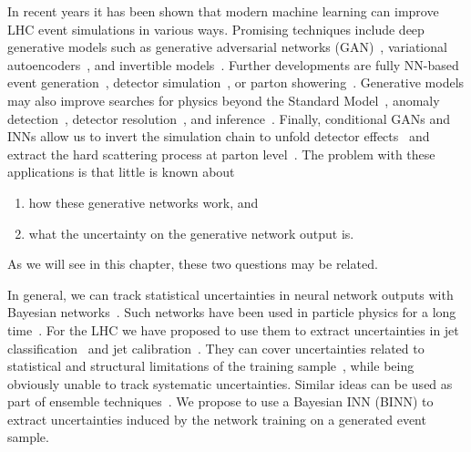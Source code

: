 In recent years it has been shown that modern machine learning can
improve LHC event simulations in various ways. 
Promising techniques include deep generative models such as generative 
adversarial networks
(GAN)~\cite{goodfellow,Creswell2018}, variational 
autoencoders~\cite{kingma2014autoencoding,Kingma2019}, and
invertible models~\cite{nflow1,nflow_review,papamakarios2019normalizing,nflow_review,mller2018neural, inn,coupling2,glow}. 
Further developments are fully NN-based event generation~\cite{dutch,gan_datasets,DijetGAN2,gan_phasespace,Alanazi:2020klf}, detector
simulation~\cite{calogan1,calogan2,fast_accurate,aachen_wgan1,aachen_wgan2,ATLASShowerGAN,ATLASsimGAN,Belayneh:2019vyx,Buhmann:2020pmy,Buhmann:2021lxj},
or parton showering~\cite{shower,by_example,monkshower,juniprshower,Dohi:2020eda}.
Generative models may also improve searches for physics beyond the
Standard Model~\cite{bsm_gan}, anomaly
detection~\cite{Nachman:2020lpy,Knapp:2020dde}, detector
resolution~\cite{DiBello:2020bas,Baldi:2020hjm}, and
inference~\cite{Brehmer:2020vwc,radev2020bayesflow}. Finally,
conditional GANs and INNs allow us to invert the simulation chain to
unfold detector effects~\cite{Datta:2018mwd,fcgan} and extract the
hard scattering process at parton level~\cite{Bellagente:2020piv}. The
problem with these applications is that little is known about
%
\begin{enumerate}
\item how these generative networks work, and
\item what the uncertainty on the generative network output is.
\end{enumerate}
%
As we will see in this chapter, these two questions may be related.

In general, we can track statistical uncertainties in
neural network outputs with Bayesian
networks~\cite{bnn_early,bnn_early2,bnn_early3,deep_errors}. Such
networks have been used in particle physics for a long
time~\cite{bnn_tev,bnn_tev2,bnn_Nu}. For the LHC we have proposed to
use them to extract uncertainties in jet
classification~\cite{Bollweg:2019skg} and jet
calibration~\cite{Kasieczka:2020vlh}. 
They can cover uncertainties related to statistical and structural
limitations of the training sample~\cite{Nachman:2019dol}, while being obviously unable to track
systematic uncertainties.  Similar ideas can be used as part of ensemble techniques~\cite{Araz:2021wqm}.
We propose to use a Bayesian INN (BINN) to extract uncertainties induced by the network training on a
generated event sample.

